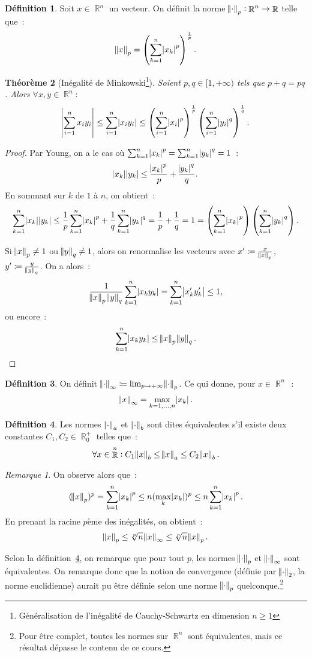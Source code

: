\documentclass{article}
\DeclareMathOperator{\R}{\mathbb R}
\newcommand{\normfty}[1]{\norm {#1}_\infty}
\newtheorem{thm}{Théorème}[section]
\theoremstyle{definition}
\newtheorem{déf}[thm]{Définition}
\theoremstyle{remark}
\newtheorem*{rmq}{Remarque}
\begin{document}
		\begin{déf} Soit $x \in \R^n$ un vecteur. On définit la norme $\norm \cdot_p : \R^n \to \R$ telle que~:
		\[\norm x_p = \left(\sum_{k=1}^n\abs{x_k}^p\right)^{\frac 1p}.\]
		\end{déf}

		\begin{thm}[Inégalité de Minkowski\footnote{Généralisation de l'inégalité de Cauchy-Schwartz en dimension $n \geq 1$}]
		Soient $p, q \in [1, +\infty)$ tels que $p+q = pq$. Alors $\forall x, y \in \R^n :$
		\[\abs {\sum_{i=1}^nx_iy_i} \leq \sum_{i=1}^n\abs{x_iy_i} \leq \left(\sum_{i=1}^n\abs {x_i}^p\right)^{\frac 1p} \left(\sum_{i=1}^n\abs {y_i}^q\right)^{\frac 1q}.\]
		\end{thm}

		\begin{proof} Par Young, on a le cas où $\sum_{k = 1}^n\abs {x_k}^p = \sum_{k=1}^n\abs{y_k}^q = 1$~:
		\[\abs{x_k}\abs{y_k} \leq \frac {\abs{x_k}^p}p + \frac {\abs {y_k}^q}q.\]
		En sommant sur $k$ de $1$ à $n$, on obtient~:
		\[\sum_{k = 1}^n\abs{x_k}\abs{y_k} \leq \frac 1p\sum_{k=1}^n\abs{x_k}^p + \frac 1q\sum_{k=1}^n\abs{y_k}^q = \frac 1p + \frac 1q = 1
		= \left(\sum_{k=1}^n\abs {x_k}^p\right) \left(\sum_{k=1}^n\abs{y_k}^q\right).\]

		Si $\norm x_p \neq 1$ ou $\norm y_q \neq 1$, alors on renormalise les vecteurs avec $x' \coloneqq \frac x{\norm x_p}$, $y' \coloneqq \frac y{\norm y_q}$.
		On a alors~:
		\[\frac 1{\norm x_p\norm y_q}\sum_{k=1}^n\abs{x_ky_k} = \sum_{k=1}^n\abs{x'_ky'_k} \leq 1,\]
		ou encore~:
		\[\sum_{k=1}^n\abs{x_ky_k} \leq \norm x_p\norm y_q.\]
		\end{proof}

		\begin{déf} On définit $\normfty \cdot \coloneqq \lim_{p \to +\infty} \norm \cdot_p$. Ce qui donne, pour $x \in \R^n$~:
		\[\normfty x = \max_{k=1, \dotsc, n}\abs{x_k}.\]
		\end{déf}

		\begin{déf}\label{equivNormes} Les normes $\norm \cdot_a$ et $\norm \cdot_b$ sont dites équivalentes s'il existe deux constantes $C_1, C_2 \in \R_0^+$
		telles que~:
		\[\forall x \in \R^n : C_1\norm x_b \leq \norm x_a \leq C_2\norm x_b.\]
		\end{déf}

		\begin{rmq} On observe alors que~:
		\[(\norm x_p)^p = \sum_{k=1}^n\abs{x_k}^p \leq n(\max_k\abs{x_k})^p \leq n\sum_{k=1}^n\abs{x_k}^p.\]
		En prenant la racine $p$ème des inégalités, on obtient~:
		\[\norm x_p \leq \sqrt[p]n \normfty x \leq \sqrt[p]n \norm x_p.\]

		Selon la définition~\ref{equivNormes}, on remarque que pour tout $p$, les normes $\norm \cdot_p$ et $\normfty \cdot$ sont équivalentes. On remarque
		donc que la notion de convergence (définie par $\norm \cdot_2$, la norme euclidienne) aurait pu être définie selon une norme $\norm \cdot_p$
		quelconque.\footnote{Pour être complet, toutes les normes sur $\R^n$ sont équivalentes, mais ce résultat dépasse le contenu de ce cours.}
		\end{rmq}
\end{document}
